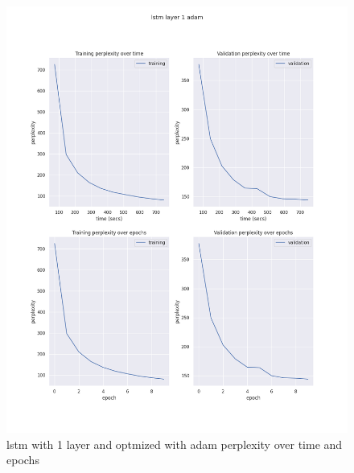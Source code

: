 \documentclass[12pt]{article}
\theoremstyle{definition}
\begin{document}
\begin{figure}[H]
     \centering
     \includegraphics[scale=0.4]{lstm_layer_1_adam.png}
     \caption{lstm with 1 layer and optmized with adam perplexity over time and epochs}
\end{figure}
\end{document}
